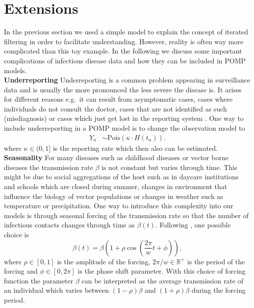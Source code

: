 \section{Extensions}\label{complications}
In the previous section we used a  simple model to explain the concept of iterated filtering  in order to facilitate understanding. However, reality is often way more complicated than this toy example. In the following we discuss some important complications of infectious disease data and how they can be included in POMP models.\\
\newline
\textbf{Underreporting} Underreporting is a common problem appearing in surveillance data and is usually the more pronounced the less severe the disease is. It arises for different reasons e.g.\ it can result from asymptomatic cases, cases where individuals do not consult the doctor, cases that are not identified as such (misdiagnosis) or  cases which just get lost in the reporting system \citep{Gibbons2014}. One way to include underreporting in a POMP model is to  change the observation model to 
\begin{align*}
Y_n &\sim \text{Pois}\left(  \kappa \cdot H(t_n)\right).
\end{align*}
where  $\kappa \in (0,1]$ is the reporting rate which then also can be estimated.\\
\newline
\noindent \textbf{Seasonality}
For many diseases such as childhood diseases or vector borne diseases the transmission rate $\beta$ is not constant but varies through time. This might be due to social aggregations of the host such as in  daycare institutions and schools which are closed during summer, changes in environment that influence the biology of vector populations or changes in weather such as temperature or precipitation. One way to introduce this complexity into our models is through seasonal  forcing  of the transmission rate so that the number of infectious contacts changes through time as  $\beta(t)$. Following \cite{kee}, one possible choice is
\begin{equation}
\beta(t)= \beta \left(1+\rho\cos\left(\frac{2\pi}{w} t +\phi\right)\right), 
\label{forcing}
\end{equation}
where $\rho\in [0,1] $ is the amplitude of the forcing,  $2\pi/w \in \mathbb{R}^+$ is the period of the forcing  and $\phi \in [0,2\pi]$  is the phase shift parameter. 
With this choice of forcing function the parameter  $\beta $ can be interpreted as the average transmission rate of an individual which varies between $(1-\rho)\beta$ and $(1+\rho)\beta$ during the forcing period. \\

